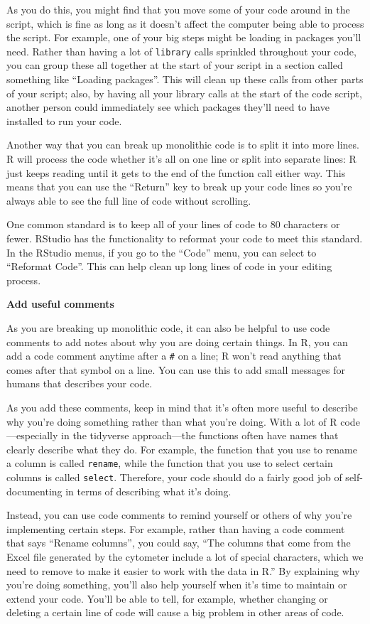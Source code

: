 \documentclass[]{tufte-book}
\begin{document}
As you do this, you might find that you move some of your code around in the
script, which is fine as long as it doesn't affect the computer being able to
process the script. For example, one of your big steps might be loading in
packages you'll need. Rather than having a lot of \texttt{library} calls sprinkled
throughout your code, you can group these all together at the start of your
script in a section called something like ``Loading packages''. This will
clean up these calls from other parts of your script; also, by having all
your library calls at the start of the code script, another person could
immediately see which packages they'll need to have installed to run your code.

Another way that you can break up monolithic code is to split it into more lines.
R will process the code whether it's all on one line or split into separate
lines: R just keeps reading until it gets to the end of the function call
either way. This means that you can use the ``Return'' key to break up your code
lines so you're always able to see the full line of code without scrolling.

One common standard is to keep all of your lines of code to 80 characters or
fewer. RStudio has the functionality to reformat your code to meet this
standard. In the RStudio menus, if you go to the ``Code'' menu, you can select
to ``Reformat Code''. This can help clean up long lines of code in your editing
process.

\textbf{Add useful comments}

As you are breaking up monolithic code, it can also be helpful to use
code comments to add notes about why you are doing certain things. In R, you
can add a code comment anytime after a \texttt{\#} on a line; R won't read anything
that comes after that symbol on a line. You can use this to add small messages
for humans that describes your code.

As you add these comments, keep in mind that it's often more useful to
describe why you're doing something rather than what you're doing. With a lot
of R code---especially in the tidyverse approach---the functions often have
names that clearly describe what they do. For example, the function that
you use to rename a column is called \texttt{rename}, while the function that you
use to select certain columns is called \texttt{select}. Therefore, your code should
do a fairly good job of self-documenting in terms of describing what it's
doing.

Instead, you can use code comments to remind yourself or others of
why you're implementing certain steps. For example, rather than having a code
comment that says ``Rename columns'', you could say, ``The columns that come
from the Excel file generated by the cytometer include a lot of special
characters, which we need to remove to make it easier to work with the data in
R.'' By explaining why you're doing something, you'll also help yourself when it's
time to maintain or extend your code. You'll be able to tell, for example,
whether changing or deleting a certain line of code will cause a big problem
in other areas of code.
\end{document}

